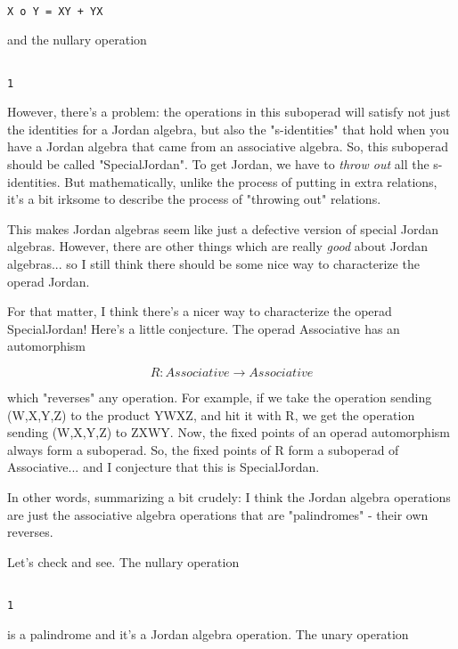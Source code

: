 \begin{verbatim}

X o Y = XY + YX
\end{verbatim}
    
and the nullary operation 


\begin{verbatim}

1
\end{verbatim}
    
However, there's a problem: the operations in this suboperad will
satisfy not just the identities for a Jordan algebra, but also the
"s-identities" that hold when you have a Jordan algebra that came 
from an associative algebra.  So, this suboperad should be called
"SpecialJordan".  To get Jordan, we have to \emph{throw out} 
all the
s-identities.  But mathematically, unlike the process of putting
in extra relations, it's a bit irksome to describe the process of
"throwing out" relations. 

This makes Jordan algebras seem like just a defective version of special
Jordan algebras.  However, there are other things which are really
\emph{good} about Jordan algebras... so I still think there should be some
nice way to characterize the operad Jordan.

For that matter, I think there's a nicer way to characterize the operad
SpecialJordan!  Here's a little conjecture.  The operad Associative has
an automorphism


$$

R: Associative \to  Associative
$$
    

which "reverses" any operation.  For example, if we take the
operation sending (W,X,Y,Z) to the product YWXZ, and hit it with R, we
get the operation sending (W,X,Y,Z) to ZXWY.  Now, the fixed points of
an operad automorphism always form a suboperad.  So, the fixed points of
R form a suboperad of Associative... and I conjecture that this is
SpecialJordan.

In other words, summarizing a bit crudely: I think the Jordan algebra
operations are just the associative algebra operations that are
"palindromes" - their own reverses.

Let's check and see.  The nullary operation


\begin{verbatim}

1
\end{verbatim}
    
is a palindrome and it's a Jordan algebra operation.  The unary
operation


